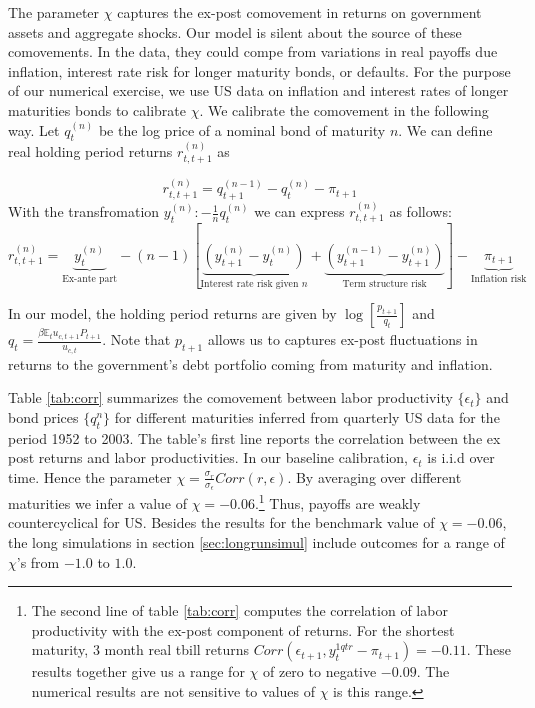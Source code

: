 \documentclass[thmsb,11pt]{article}
\begin{document}
The parameter $\chi$ captures the ex-post comovement in returns on government assets  and aggregate shocks.
Our model is silent about the source of these comovements. In the data,  they could
compe from variations in real payoffs due inflation, interest rate risk for longer maturity bonds,  or defaults.
For the purpose of our numerical exercise, we use US data on inflation and interest rates of longer maturities bonds to calibrate $\chi$.
We calibrate the comovement in the following way.
Let $q^{(n)}_t$ be the log price of a nominal bond of maturity $n$. We can define  real holding period returns $r^{(n)}_{t,t+1}$ as

 \[r^{(n)}_{t,t+1}= q^{(n-1)}_{t+1}-q_t^{(n)}-\pi_{t+1}\]
 With the transfromation $y^{(n)}_t: -\frac{1}{n} q^{(n)}_t$ we can express $r^{(n)}_{t,t+1}$ as follows:
 \[r^{(n)}_{t,t+1}=\underbrace{y^{(n)}_t}_{\text{Ex-ante part}} - (n-1)\left[\underbrace{\left(y^{(n)}_{t+1}-y^{(n)}_{t}\right)}_{\text{Interest rate risk given $n$}}+\underbrace{\left(y^{(n-1)}_{t+1}-y^{(n)}_{t+1}\right)}_{\text{Term structure risk}}\right]-\underbrace{\pi_{t+1}}_{\text{Inflation risk}}\]

 In our model, the holding period returns are given by $\log\left[\frac{p_{t+1}}{q_{t}}\right]$ and $q_t=\frac{\beta \mathbb{E}_tu_{c,t+1}P_{t+1}}{u_{c,t}}$. Note that $p_{t+1}$ allows us to captures ex-post fluctuations in returns to the government's debt  portfolio coming from maturity and inflation.



Table \ref{tab:corr} summarizes the comovement between labor productivity $\{\epsilon_t\}$ and bond prices $\{q^{n}_t\}$ for different maturities inferred from  quarterly US data for the period 1952 to 2003.
The table's first line reports the correlation between the ex post returns and labor productivities.
In our baseline calibration, $\epsilon_{t}$ is i.i.d over time. Hence the parameter $\chi=\frac{\sigma_{r}}{\sigma_{\epsilon}} Corr(r,\epsilon)$.
By averaging over different maturities we infer a value of $\chi=-0.06$.\footnote{The  second line of table \ref{tab:corr} computes
 the correlation of labor productivity with the  ex-post component of returns.
For the shortest maturity, 3 month real tbill returns $ Corr(\epsilon_{t+1},y^{1 qtr}_{t}-\pi_{t+1})=-0.11$. These results together give us a
range for $\chi$ of zero to negative $-0.09$. The numerical results are not sensitive to values of $\chi$ is this range.} Thus,
payoffs are weakly countercyclical for US. Besides the results for the benchmark value of $\chi=-0.06$,
the long simulations in  section \ref{sec:longrunsimul} include outcomes for a  range of $\chi$'s from $-1.0$ to $1.0$.
\end{document}
